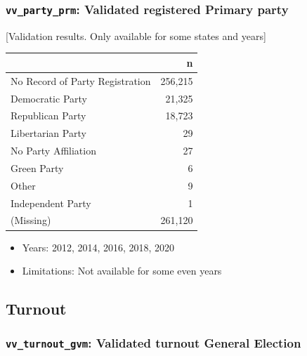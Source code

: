 \documentclass[10pt,article,oneside]{memoir}
\theoremstyle{definition}
\begin{document}
\hypertarget{vv_party_prm-validated-registered-primary-party}{%
\subsubsection{\texorpdfstring{\texttt{vv\_party\_prm}: Validated
registered Primary
party}{vv\_party\_prm: Validated registered Primary party}}\label{vv_party_prm-validated-registered-primary-party}}

{[}Validation results. Only available for some states and years{]}

\begin{table}[H]
\centering
\begin{tabular}[t]{lr}
\toprule
 & n\\
\midrule
No Record of Party Registration & 256,215\\
Democratic Party & 21,325\\
Republican Party & 18,723\\
Libertarian Party & 29\\
No Party Affiliation & 27\\
Green Party & 6\\
Other & 9\\
Independent Party & 1\\
(Missing) & 261,120\\
\bottomrule
\end{tabular}
\end{table}

\begin{itemize}
\tightlist
\item
  Years: 2012, 2014, 2016, 2018, 2020
\item
  Limitations: Not available for some even years
\end{itemize}

\newpage

\hypertarget{turnout}{%
\subsection{Turnout}\label{turnout}}

\hypertarget{vv_turnout_gvm-validated-turnout-general-election}{%
\subsubsection{\texorpdfstring{\texttt{vv\_turnout\_gvm}: Validated
turnout General
Election}{vv\_turnout\_gvm: Validated turnout General Election}}\label{vv_turnout_gvm-validated-turnout-general-election}}
\end{document}
